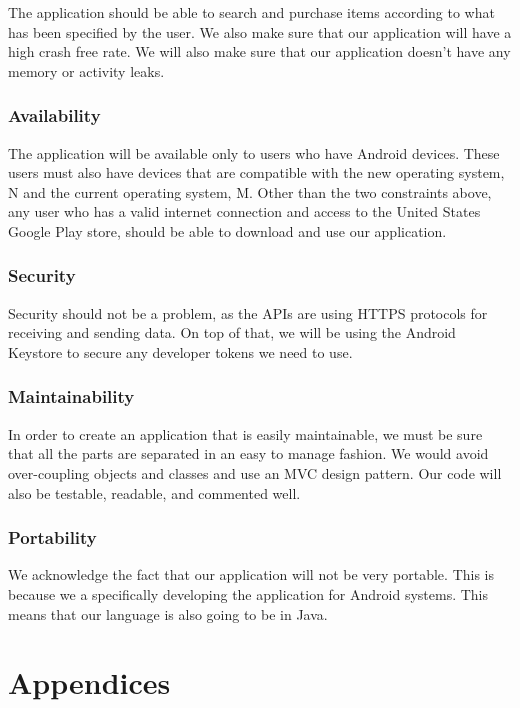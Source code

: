 \documentclass[journal,compsoc, 10pt, draftclsnofoot, onecolumn]{IEEEtran}
\begin{document}
The application should be able to search and purchase items according to what 
has been specified by the user. We also make sure that our application will 
have a high crash free rate. We will also make sure that our application doesn't
 have any memory or activity leaks.

\subsubsection{Availability}

The application will be available only to users who have Android devices. These 
users must also have devices that are compatible with the new operating system, 
N and the current operating system, M. Other than the two constraints above, 
any user who has a valid internet connection and access to the United 
States Google Play store, should be able to download and use our application.

\subsubsection{Security}

Security should not be a problem, as the APIs are using HTTPS protocols for 
receiving and sending data. On top of that, we will be using the Android 
Keystore to secure any developer tokens we need to use.

\subsubsection{Maintainability}

In order to create an application that is easily maintainable, we must be sure 
that all the parts are separated in an easy to manage fashion. We would avoid 
over-coupling objects and classes and use an MVC design pattern. Our code 
will also be testable, readable, and commented well.

\subsubsection{Portability}

We acknowledge the fact that our application will not be very portable. This is 
because we a specifically developing the application for Android systems. This 
means that our language is also going to be in Java. 

\newpage

\section{Appendices}
\end{document}
